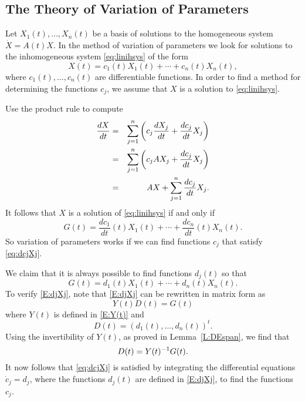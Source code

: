 \documentclass{ximera}
\begin{document}
\subsection*{The Theory of Variation of Parameters}

Let $X_1(t),\ldots,X_n(t)$ be a 
basis of solutions to the homogeneous 
system $\dot{X}=A(t)X$.   In the method of variation of parameters we look 
for solutions to  the inhomogeneous system \eqref{eq:linihsys} of the form
\[
X(t) = c_1(t)X_1(t) + \cdots + c_n(t)X_n(t),
\]
where $c_1(t),\ldots,c_n(t)$ are differentiable functions.  In order to 
find a method for determining the functions $c_j$, we assume that $X$ is 
a solution to \eqref{eq:linihsys}.  

Use the product rule to compute
\begin{eqnarray*}
\displaystyle\frac{dX}{dt} & = &\sum_{j=1}^n\left(c_j\frac{dX_j}{dt}
+\frac{dc_j}{dt} X_j\right)\\
& = & \sum_{j=1}^n\left( c_jAX_j+\frac{dc_j}{dt}X_j\right)\\
& = & AX+\sum_{j=1}^n \frac{dc_j}{dt}X_j.
\end{eqnarray*}
It follows that $X$ is a solution of \eqref{eq:linihsys} if and only if
\begin{equation}  \label{eq:dcjXj}
G(t) = \frac{dc_1}{dt}(t) X_1(t) + \cdots + \frac{dc_n}{dt}(t) X_n(t).
\end{equation}
So variation of parameters works if we can find functions $c_j$ that 
satisfy \eqref{eq:dcjXj}.

We claim that it is always possible to find functions $d_j(t)$ so that 
\begin{equation}  \label{E:djXj}
G(t) = d_1(t)X_1(t) + \cdots + d_n(t)X_n(t).
\end{equation} 
To verify \eqref{E:djXj}, note that  \eqref{E:djXj} can be rewritten in matrix 
form as
\[
Y(t) D(t) = G(t)
\]
where $Y(t)$ is defined in \eqref{E:Y(t)} and
\[
D(t)=(d_1(t),\ldots,d_n(t))^t.
\]
Using the invertibility of 
$Y(t)$, as proved in Lemma~\ref{L:DEspan}, we find that
\[
D(t) = Y(t)^{-1} G(t).
\] 
It now follows that \eqref{eq:dcjXj} is satisfied by integrating the 
differential equations $\dot{c}_j=d_j$, where the functions $d_j(t)$ 
are defined in \eqref{E:djXj}, to find the functions $c_j$.  
\end{document}
